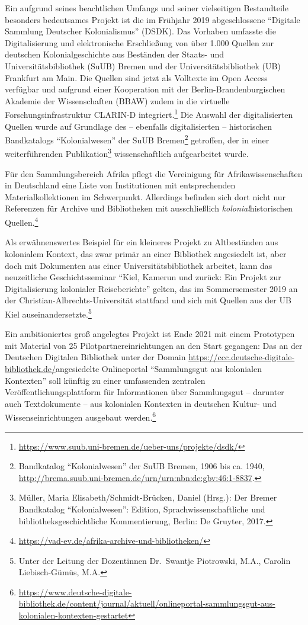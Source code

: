 \documentclass[a4paper,
fontsize=11pt,
oneside,
numbers=noperiodatend,
parskip=half-,
bibliography=totoc,
final
]{scrartcl}
\begin{document}
Ein aufgrund seines beachtlichen Umfangs und seiner vielseitigen
Bestandteile besonders bedeutsames Projekt ist die im Frühjahr 2019
abgeschlossene \enquote{Digitale Sammlung Deutscher Kolonialismus}
(DSDK). Das Vorhaben umfasste die Digitalisierung und elektronische
Erschließung von über 1.000 Quellen zur deutschen Kolonialgeschichte aus
Beständen der Staats- und Universitätsbibliothek (SuUB) Bremen und der
Universitätsbibliothek (UB) Frankfurt am Main. Die Quellen sind jetzt
als Volltexte im Open Access verfügbar und aufgrund einer Kooperation
mit der Berlin-Brandenburgischen Akademie der Wissenschaften (BBAW)
zudem in die virtuelle Forschungsinfrastruktur CLARIN-D
integriert.\footnote{\url{https://www.suub.uni-bremen.de/ueber-uns/projekte/dsdk/}}
Die Auswahl der digitalisierten Quellen wurde auf Grundlage des --
ebenfalls digitalisierten -- historischen Bandkatalogs
\enquote{Kolonialwesen} der SuUB Bremen\footnote{Bandkatalog
  \enquote{Kolonialwesen} der SuUB Bremen, 1906 bis ca. 1940,
  \url{http://brema.suub.uni-bremen.de/urn/urn:nbn:de:gbv:46:1-8837}.}
getroffen, der in einer weiterführenden Publikation\footnote{Müller,
  Maria Elisabeth/Schmidt-Brücken, Daniel (Hrsg.): Der Bremer
  Bandkatalog \enquote{Kolonialwesen}: Edition, Sprachwissenschaftliche
  und bibliotheksgeschichtliche Kommentierung, Berlin: De Gruyter, 2017.}
wissenschaftlich aufgearbeitet wurde.

Für den Sammlungsbereich Afrika pflegt die Vereinigung für
Afrikawissenschaften in Deutschland eine Liste von Institutionen mit
entsprechenden Materialkollektionen im Schwerpunkt. Allerdings befinden
sich dort nicht nur Referenzen für Archive und Bibliotheken mit
ausschließlich \emph{kolonial}historischen Quellen.\footnote{\url{https://vad-ev.de/afrika-archive-und-bibliotheken/}}

Als erwähnenswertes Beispiel für ein kleineres Projekt zu Altbeständen
aus kolonialem Kontext, das zwar primär an einer Bibliothek angesiedelt
ist, aber doch mit Dokumenten aus einer Universitätsbibliothek arbeitet,
kann das neuzeitliche Geschichtsseminar \enquote{Kiel, Kamerun und
zurück: Ein Projekt zur Digitalisierung kolonialer Reiseberichte}
gelten, das im Sommersemester 2019 an der
Christian-Albrechts-Universität stattfand und sich mit Quellen aus der
UB Kiel auseinandersetzte.\footnote{Unter der Leitung der Dozentinnen
  Dr.~Swantje Piotrowski, M.A., Carolin Liebisch-Gümüs, M.A.}

Ein ambitioniertes groß angelegtes Projekt ist Ende 2021 mit einem
Prototypen mit Material von 25 Pilotpartnereinrichtungen an den Start
gegangen: Das an der Deutschen Digitalen Bibliothek unter der Domain
\url{https://ccc.deutsche-digitale-bibliothek.de/}angesiedelte
Onlineportal \enquote{Sammlungsgut aus kolonialen Kontexten} soll
künftig zu einer umfassenden zentralen Veröffentlichungsplattform für
Informationen über Sammlungsgut -- darunter auch Textdokumente -- aus
kolonialen Kontexten in deutschen Kultur- und Wissenseinrichtungen
ausgebaut werden.\footnote{\url{https://www.deutsche-digitale-bibliothek.de/content/journal/aktuell/onlineportal-sammlungsgut-aus-kolonialen-kontexten-gestartet}}
\end{document}
